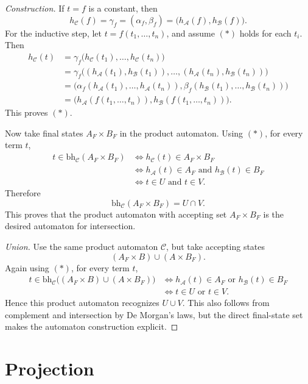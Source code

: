 \documentclass[11pt]{article}
\theoremstyle{definition}
\newcommand{\Aut}{\mathcal A}
\newcommand{\bh}{\mathrm{bh}}
\begin{document}
\begin{proof}[Construction]
If \(t=f\) is a constant, then
\[
  h_{\mathcal C}(f)=\gamma_f=(\alpha_f,\beta_f)
  =
  \bigl(h_\Aut(f),h_{\mathcal B}(f)\bigr).
\]
For the inductive step, let \(t=f(t_1,\ldots,t_n)\), and assume \((*)\) holds
for each \(t_i\).  Then
\begin{align*}
  h_{\mathcal C}(t)
  &=
  \gamma_f\bigl(h_{\mathcal C}(t_1),\ldots,h_{\mathcal C}(t_n)\bigr) \\
  &=
  \gamma_f\bigl((h_\Aut(t_1),h_{\mathcal B}(t_1)),\ldots,
    (h_\Aut(t_n),h_{\mathcal B}(t_n))\bigr) \\
  &=
  \bigl(\alpha_f(h_\Aut(t_1),\ldots,h_\Aut(t_n)),
        \beta_f(h_{\mathcal B}(t_1),\ldots,h_{\mathcal B}(t_n))\bigr) \\
  &=
  \bigl(h_\Aut(f(t_1,\ldots,t_n)),
        h_{\mathcal B}(f(t_1,\ldots,t_n))\bigr).
\end{align*}
This proves \((*)\).

Now take final states \(A_F\times B_F\) in the product automaton.  Using
\((*)\), for every term \(t\),
\begin{align*}
  t\in\bh_{\mathcal C}(A_F\times B_F)
  &\Longleftrightarrow
  h_{\mathcal C}(t)\in A_F\times B_F \\
  &\Longleftrightarrow
  h_\Aut(t)\in A_F \text{ and } h_{\mathcal B}(t)\in B_F \\
  &\Longleftrightarrow
  t\in U \text{ and } t\in V.
\end{align*}
Therefore
\[
  \bh_{\mathcal C}(A_F\times B_F)=U\cap V.
\]
This proves that the product automaton with accepting set \(A_F\times B_F\) is
the desired automaton for intersection.

\emph{Union.}  Use the same product automaton \(\mathcal C\), but take accepting
states
\[
  (A_F\times B)\cup(A\times B_F).
\]
Again using \((*)\), for every term \(t\),
\begin{align*}
  t\in\bh_{\mathcal C}\bigl((A_F\times B)\cup(A\times B_F)\bigr)
  &\Longleftrightarrow
  h_\Aut(t)\in A_F \text{ or } h_{\mathcal B}(t)\in B_F \\
  &\Longleftrightarrow
  t\in U \text{ or } t\in V.
\end{align*}
Hence this product automaton recognizes \(U\cup V\).  This also follows from
complement and intersection by De Morgan's laws, but the direct final-state set
makes the automaton construction explicit.
\end{proof}

\section{Projection}
\end{document}
